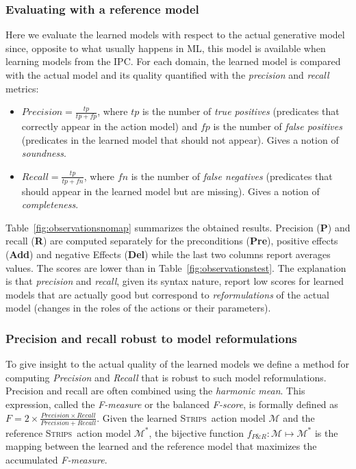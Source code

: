 \documentclass{article}
\newcommand{\strips}{\textsc{Strips}}     %
\begin{document}
\subsubsection{Evaluating with a reference model}
Here we evaluate the learned models with respect to the actual generative model since, opposite to what usually happens in ML, this model is available when learning models from the IPC. For each domain, the learned model is compared with the actual model and its quality quantified with the {\em precision} and {\em recall} metrics:
\begin{itemize}
\item $Precision=\frac{tp}{tp+fp}$, where $tp$ is the number of {\em true positives} (predicates that correctly appear in the action model) and $fp$ is the number of {\em false positives} (predicates in the learned model that should not appear). Gives a notion of {\em soundness}.
\item $Recall=\frac{tp}{tp+fn}$, where $fn$ is the number of {\em false negatives} (predicates that should appear in the learned model but are missing). Gives a notion of {\em completeness}.
\end{itemize}

Table~\ref{fig:observationsnomap} summarizes the obtained results. Precision ({\bf P}) and recall ({\bf R}) are computed separately for the preconditions ({\bf Pre}), positive effects ({\bf Add}) and negative Effects ({\bf Del}) while the last two columns report averages values. The scores are lower than in Table~\ref{fig:observationstest}. The explanation is that {\em precision} and {\em recall}, given its syntax nature, report low scores for learned models that are actually good but correspond to {\em reformulations} of the actual model (changes in the roles of the actions or their parameters).

\subsubsection{Precision and recall robust to model reformulations}
To give insight to the actual quality of the learned models we define a method for computing {\em Precision} and {\em Recall} that is robust to such model reformulations. Precision and recall are often combined using the {\em harmonic mean}. This expression, called the {\em F-measure} or the balanced {\em F-score}, is formally defined as $F=2\times\frac{Precision\times Recall}{Precision+Recall}$. Given the learned \strips\ action model $\mathcal{M}$ and the reference \strips\ action model $\mathcal{M}^*$, the bijective function $f_{P\&R}:\mathcal{M} \mapsto \mathcal{M}^*$ is the mapping between the learned and the reference model that maximizes the accumulated {\em F-measure}.
\end{document}
